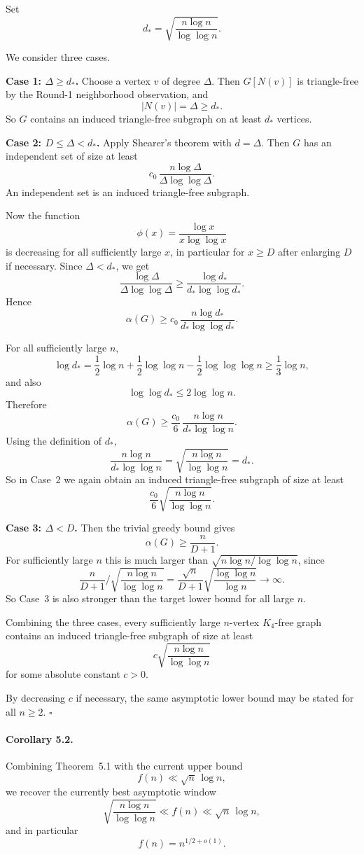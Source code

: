 Set
\[
d_\ast=\sqrt{\frac{n\log n}{\log\log n}}.
\]

We consider three cases.

\medskip
\noindent
\textbf{Case 1: $\Delta\ge d_\ast$.}
Choose a vertex $v$ of degree $\Delta$. Then $G[N(v)]$ is triangle-free by the Round-1 neighborhood observation, and
\[
|N(v)|=\Delta\ge d_\ast.
\]
So $G$ contains an induced triangle-free subgraph on at least $d_\ast$ vertices.

\medskip
\noindent
\textbf{Case 2: $D\le \Delta<d_\ast$.}
Apply Shearer's theorem with $d=\Delta$. Then $G$ has an independent set of size at least
\[
c_0\,\frac{n\log \Delta}{\Delta\log\log \Delta}.
\]
An independent set is an induced triangle-free subgraph.

Now the function
\[
\phi(x)=\frac{\log x}{x\log\log x}
\]
is decreasing for all sufficiently large $x$, in particular for $x\ge D$ after enlarging $D$ if necessary. Since $\Delta<d_\ast$, we get
\[
\frac{\log \Delta}{\Delta\log\log \Delta}
\ge
\frac{\log d_\ast}{d_\ast\log\log d_\ast}.
\]
Hence
\[
\alpha(G)\ge c_0\,\frac{n\log d_\ast}{d_\ast\log\log d_\ast}.
\]

For all sufficiently large $n$,
\[
\log d_\ast
=
\frac12\log n+\frac12\log\log n-\frac12\log\log\log n
\ge \frac13\log n,
\]
and also
\[
\log\log d_\ast\le 2\log\log n.
\]
Therefore
\[
\alpha(G)\ge
\frac{c_0}{6}\,
\frac{n\log n}{d_\ast\log\log n}.
\]
Using the definition of $d_\ast$,
\[
\frac{n\log n}{d_\ast\log\log n}
=
\sqrt{\frac{n\log n}{\log\log n}}
=
d_\ast.
\]
So in Case~2 we again obtain an induced triangle-free subgraph of size at least
\[
\frac{c_0}{6}\sqrt{\frac{n\log n}{\log\log n}}.
\]

\medskip
\noindent
\textbf{Case 3: $\Delta<D$.}
Then the trivial greedy bound gives
\[
\alpha(G)\ge \frac{n}{D+1}.
\]
For sufficiently large $n$ this is much larger than $\sqrt{n\log n/\log\log n}$, since
\[
\frac{n}{D+1}\bigg/\sqrt{\frac{n\log n}{\log\log n}}
=
\frac{\sqrt n}{D+1}\sqrt{\frac{\log\log n}{\log n}}
\to \infty.
\]
So Case~3 is also stronger than the target lower bound for all large $n$.

Combining the three cases, every sufficiently large $n$-vertex $K_4$-free graph contains an induced triangle-free subgraph of size at least
\[
c\sqrt{\frac{n\log n}{\log\log n}}
\]
for some absolute constant $c>0$.

By decreasing $c$ if necessary, the same asymptotic lower bound may be stated for all $n\ge 2$.
\hfill $\square$

\paragraph{Corollary 5.2.}
Combining Theorem~5.1 with the current upper bound
\[
f(n)\ll \sqrt n\,\log n,
\]
we recover the currently best asymptotic window
\[
\sqrt{\frac{n\log n}{\log\log n}}
\ll f(n)\ll \sqrt n\,\log n,
\]
and in particular
\[
f(n)=n^{1/2+o(1)}.
\]

